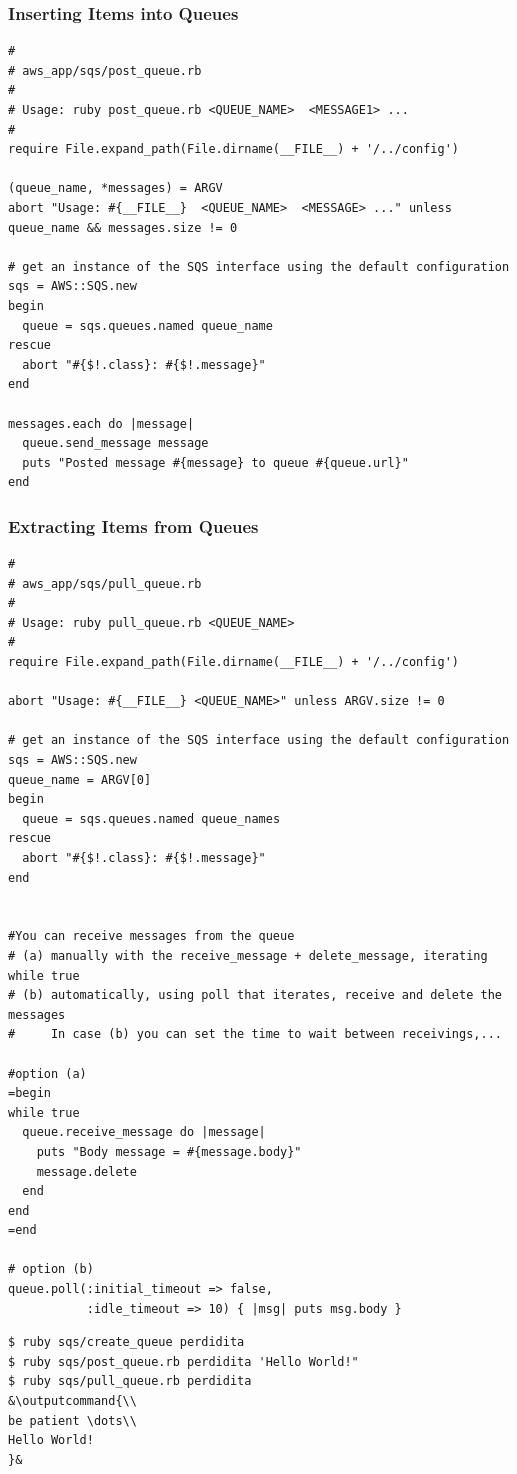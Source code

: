 \documentclass{beamer}
\newcommand{\outputcommand}[1]{\color{darkgreen}{#1|}}
\begin{document}
\begin{frame}
\frametitle{Inserting Items into Queues}
\lstset{language=Ruby, style=eclipse}
\begin{lstlisting}
#
# aws_app/sqs/post_queue.rb
#
# Usage: ruby post_queue.rb <QUEUE_NAME>  <MESSAGE1> ...
#
require File.expand_path(File.dirname(__FILE__) + '/../config')

(queue_name, *messages) = ARGV
abort "Usage: #{__FILE__}  <QUEUE_NAME>  <MESSAGE> ..." unless queue_name && messages.size != 0

# get an instance of the SQS interface using the default configuration
sqs = AWS::SQS.new
begin
  queue = sqs.queues.named queue_name
rescue
  abort "#{$!.class}: #{$!.message}"
end

messages.each do |message|
  queue.send_message message
  puts "Posted message #{message} to queue #{queue.url}"
end
\end{lstlisting}
\end{frame}
\begin{frame}
\frametitle{Extracting Items from Queues}
\lstset{language=Ruby, style=eclipse}
\begin{lstlisting}
#
# aws_app/sqs/pull_queue.rb
#
# Usage: ruby pull_queue.rb <QUEUE_NAME>
#
require File.expand_path(File.dirname(__FILE__) + '/../config')

abort "Usage: #{__FILE__} <QUEUE_NAME>" unless ARGV.size != 0

# get an instance of the SQS interface using the default configuration
sqs = AWS::SQS.new
queue_name = ARGV[0]
begin
  queue = sqs.queues.named queue_names
rescue
  abort "#{$!.class}: #{$!.message}"
end


#You can receive messages from the queue 
# (a) manually with the receive_message + delete_message, iterating while true
# (b) automatically, using poll that iterates, receive and delete the messages
#     In case (b) you can set the time to wait between receivings,...

#option (a)
=begin
while true
  queue.receive_message do |message|
    puts "Body message = #{message.body}"
    message.delete
  end
end
=end

# option (b)
queue.poll(:initial_timeout => false,
           :idle_timeout => 10) { |msg| puts msg.body }
\end{lstlisting}

\lstset{language=shell}
\begin{lstlisting}[escapechar=&]
$ ruby sqs/create_queue perdidita
$ ruby sqs/post_queue.rb perdidita 'Hello World!"
$ ruby sqs/pull_queue.rb perdidita
&\outputcommand{\\
be patient \dots\\
Hello World!
}&
\end{lstlisting}
\end{frame}
\end{document}
